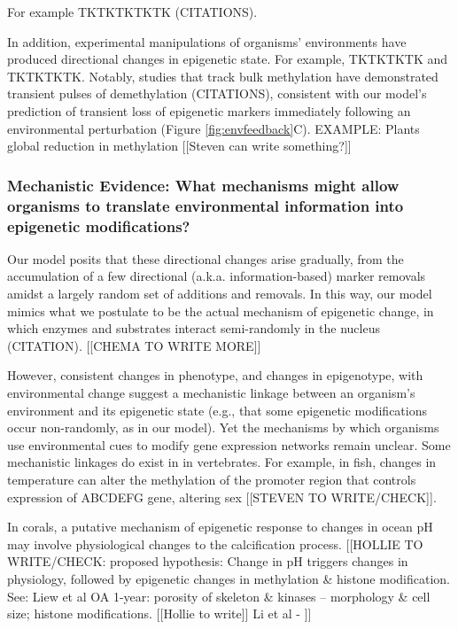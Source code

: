 \documentclass{article}
\begin{document}
\citet{liew2018epigenome}

For example TKTKTKTKTK (CITATIONS). 

In addition, experimental manipulations of organisms' environments have produced directional changes in epigenetic state. For example, TKTKTKTK and TKTKTKTK. Notably, studies that track bulk methylation have demonstrated transient pulses of demethylation (CITATIONS), consistent with our model's prediction of transient loss of epigenetic markers immediately following an environmental perturbation (Figure \ref{fig:envfeedback}C). EXAMPLE: Plants global reduction in methylation [[Steven can write something?]]


\subsubsection{Mechanistic Evidence: What mechanisms might allow organisms to translate environmental information into epigenetic modifications?}

Our model posits that these directional changes arise gradually, from the accumulation of a few directional (a.k.a. information-based) marker removals amidst a largely random set of additions and removals. In this way, our model mimics what we postulate to be the actual mechanism of epigenetic change, in which enzymes and substrates interact semi-randomly in the nucleus (CITATION). [[CHEMA TO WRITE MORE]]

However, consistent changes in phenotype, and changes in epigenotype, with environmental change suggest a mechanistic linkage between an organism's environment and its epigenetic state (e.g., that some epigenetic modifications occur non-randomly, as in our model). Yet the mechanisms by which organisms use environmental cues to modify gene expression networks remain unclear. Some mechanistic linkages do exist in in vertebrates. For example, in fish, changes in temperature can alter the methylation of the promoter region that controls expression of ABCDEFG gene, altering sex [[STEVEN TO WRITE/CHECK]]. 

In corals, a putative mechanism of epigenetic response to changes in ocean pH may involve physiological changes to the calcification process. [[HOLLIE TO WRITE/CHECK: proposed hypothesis: Change in pH triggers changes in physiology, followed by epigenetic changes in methylation \& histone modification. See: Liew et al OA 1-year: porosity of skeleton \& kinases – morphology \& cell size; histone modifications. [[Hollie to write]] Li et al  - ]]
\end{document}
